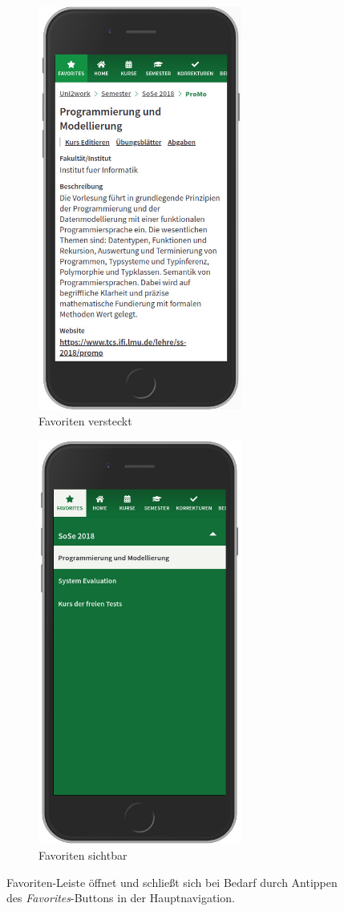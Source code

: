 \documentclass[11pt,a4paper,twoside,ngerman]{article}
\begin{document}
\begin{figure}
    \begin{subfigure}{.49\textwidth}
      \includegraphics[width=67mm]{images/m_uni2work_promo_favorites_hidden.jpg}
      \caption{Favoriten versteckt}
      \label{fig:uni2work_fav_hid}
    \end{subfigure}%
    \hfill
    \begin{subfigure}{.49\textwidth}
      \includegraphics[width=67mm]{images/m_uni2work_promo_favorites_visible.jpg}
      \caption{Favoriten sichtbar}
      \label{fig:uni2work_fav_vis}
    \end{subfigure}
    \caption{Favoriten-Leiste öffnet und schließt sich bei Bedarf durch Antippen des \textit{Favorites}-Buttons in der Hauptnavigation.}
    \label{fig:uni2work_mobile_favorites}
\end{figure}
\end{document}
